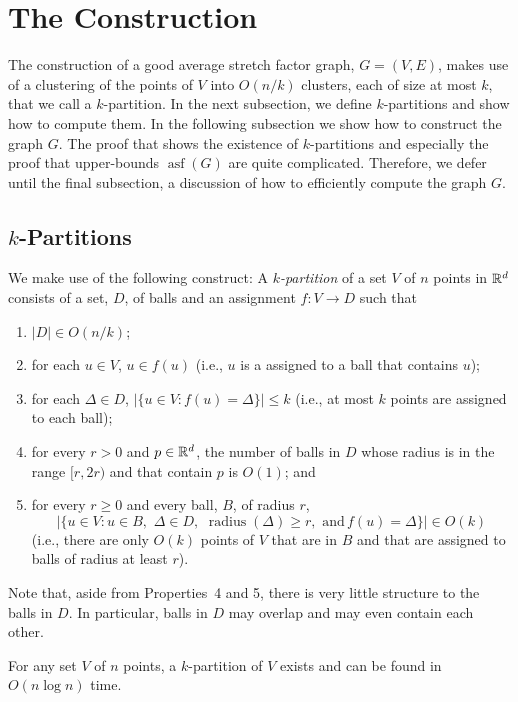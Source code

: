 \documentclass{patmorin}
\DeclareMathOperator{\asf}{asf}
\DeclareMathOperator{\radius}{radius}
\newcommand{\mand}{\mathrm{,\,\,and\,}}
\newcommand{\oand}{\mathrm{,\,\,}}
\begin{document}
\section{The Construction}

The construction of a good average stretch factor graph, $G=(V,E)$,
makes use of a clustering of the points of $V$ into $O(n/k)$ clusters,
each of size at most $k$, that we call a $k$-partition.  In the next
subsection, we define $k$-partitions and show how to compute them.
In the following subsection we show how to construct the graph $G$.
The proof that shows the existence of $k$-partitions and especially the
proof that upper-bounds $\asf(G)$ are quite complicated.  Therefore,
we defer until the final subsection, a discussion of how to efficiently
compute the graph $G$.


\subsection{$k$-Partitions}

We make use of the following construct:  A \emph{$k$-partition} of a
set $V$ of $n$ points in $\mathbb{R}^d$ consists of a set, $D$, of balls and an
assignment $f:V\to D$ such that
\begin{enumerate}
  \item $|D|\in O(n/k)$;
  \item for each $u\in V$, $u\in f(u)$ (i.e., $u$ is a assigned to a
    ball that contains $u$);
  \item for each $\Delta\in D$, $|\{u\in V: f(u)=\Delta\}|\le k$ (i.e.,
   at most $k$ points are assigned to each ball);
  \item for every $r> 0$ and $p\in\mathbb{R}^d$, the number of balls
   in $D$ whose radius is in the range $[r,2r)$ and that contain $p$
   is $O(1)$; and
  \item for every $r\ge 0$ and every ball, $B$, of radius $r$, 
   \[
      |\{ u\in V : u\in B \oand \Delta\in D
        \oand \radius(\Delta)\ge r \mand f(u)=\Delta\}| \in O(k)
   \] 
   (i.e., there are only $O(k)$ points
   of $V$ that are in $B$ and that are assigned to balls of radius at
   least $r$).
\end{enumerate}

Note that, aside from Properties~4 and 5, there is very little structure
to the balls in $D$. In particular, balls in $D$ may overlap and may
even contain each other.

\begin{lem}
  For any set $V$ of $n$ points, a $k$-partition of $V$ exists and can
  be found in $O(n\log n)$ time.
\end{lem}
\end{document}
